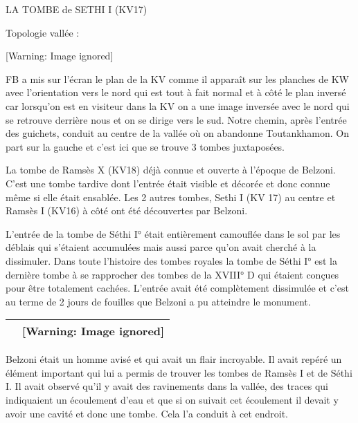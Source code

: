 \documentclass{article}
\title{}
\begin{document}
LA TOMBE de SETHI I  (KV17)

Topologie vallée : 

  [Warning: Image ignored] %
 

FB a mis sur l’écran le plan de la KV comme il apparaît sur les planches
de KW avec l’orientation vers le nord qui est tout à fait normal et à
côté le plan inversé car lorsqu’on est en visiteur dans la KV on a une
image inversée avec le nord qui se retrouve derrière nous et on se
dirige vers le sud.  Notre chemin, après l’entrée des guichets, conduit
au centre de la vallée où on abandonne Toutankhamon. On part sur la
gauche et c’est ici que se trouve 3 tombes juxtaposées.

La tombe de Ramsès X (KV18) déjà connue et ouverte à l’époque de
Belzoni. C’est une tombe tardive dont l’entrée était visible et décorée
et donc connue même si elle était ensablée. Les 2 autres tombes, Sethi
I (KV 17) au centre et Ramsès I (KV16) à côté ont été découvertes par
Belzoni.

L’entrée de la tombe de Séthi I°  était entièrement camouflée dans le
sol par les déblais qui s’étaient accumulées mais aussi parce qu’on
avait cherché à la dissimuler. Dans toute l’histoire des tombes royales
la tombe de Séthi I° est la dernière tombe à se rapprocher des tombes
de la XVIII° D qui étaient conçues pour être totalement cachées.
L’entrée avait été complètement dissimulée et c’est au terme de 2 jours
de fouilles que Belzoni a pu atteindre le monument.

\begin{flushleft}
\tablehead{}
\begin{supertabular}{|l|l|}
  &   [Warning: Image ignored] %
 \\\hline
\end{supertabular}
\end{flushleft}
Belzoni était un homme avisé et qui avait un flair incroyable. Il avait
repéré un élément important qui lui a permis de trouver les tombes de
Ramsès I et de Séthi I. Il avait observé qu’il y avait des ravinements
dans la vallée, des traces qui indiquaient un écoulement d’eau et que
si on suivait cet écoulement il devait y avoir une cavité et donc une
tombe. Cela l’a conduit à cet endroit.
\end{document}
